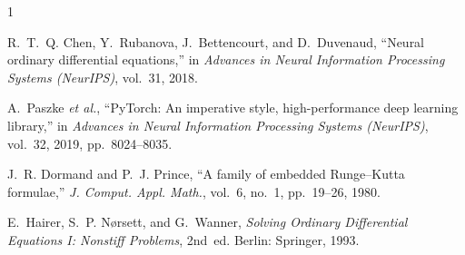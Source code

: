 \documentclass[11pt]{article}
\begin{document}
\begin{thebibliography}{1}

R.~T.~Q. Chen, Y.~Rubanova, J.~Bettencourt, and D.~Duvenaud,
``Neural ordinary differential equations,'' in
\textit{Advances in Neural Information Processing Systems (NeurIPS)},
vol.~31, 2018.

A.~Paszke \textit{et al.},
``{PyTorch}: An imperative style, high-performance deep learning library,'' in
\textit{Advances in Neural Information Processing Systems (NeurIPS)},
vol.~32, 2019, pp.~8024--8035.

J.~R. Dormand and P.~J. Prince,
``A family of embedded {Runge--Kutta} formulae,''
\textit{J. Comput. Appl. Math.}, vol.~6, no.~1, pp.~19--26, 1980.

E.~Hairer, S.~P. N{\o}rsett, and G.~Wanner,
\textit{Solving Ordinary Differential Equations I: Nonstiff Problems},
2nd~ed.\hspace{0.5em} Berlin: Springer, 1993.

\end{thebibliography}
\end{document}
